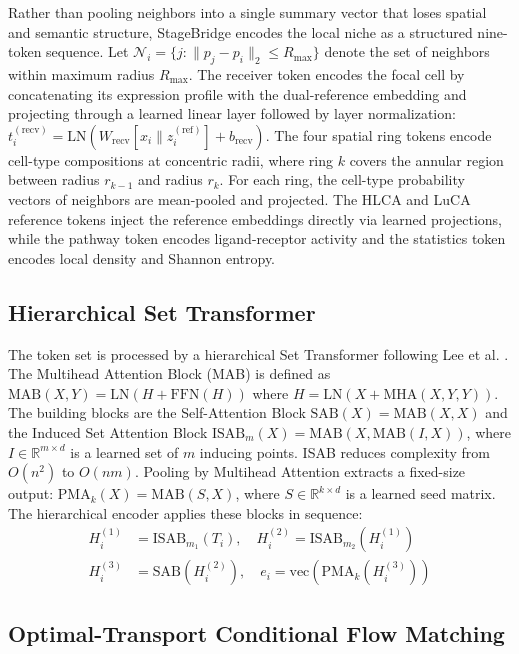 \documentclass[conference]{IEEEtran}
\begin{document}
Rather than pooling neighbors into a single summary vector that loses spatial and semantic structure, StageBridge encodes the local niche as a structured nine-token sequence. Let $\mathcal{N}_i = \{j : \|p_j - p_i\|_2 \leq R_{\max}\}$ denote the set of neighbors within maximum radius $R_{\max}$. The receiver token encodes the focal cell by concatenating its expression profile with the dual-reference embedding and projecting through a learned linear layer followed by layer normalization: $t_i^{(\text{recv})} = \text{LN}(W_{\text{recv}} [x_i \| z_i^{(\text{ref})}] + b_{\text{recv}})$. The four spatial ring tokens encode cell-type compositions at concentric radii, where ring $k$ covers the annular region between radius $r_{k-1}$ and radius $r_k$. For each ring, the cell-type probability vectors of neighbors are mean-pooled and projected. The HLCA and LuCA reference tokens inject the reference embeddings directly via learned projections, while the pathway token encodes ligand-receptor activity and the statistics token encodes local density and Shannon entropy.

\subsection{Hierarchical Set Transformer}

The token set is processed by a hierarchical Set Transformer following Lee et al. \cite{Lee2018-ya}. The Multihead Attention Block (MAB) is defined as $\text{MAB}(X, Y) = \text{LN}(H + \text{FFN}(H))$ where $H = \text{LN}(X + \text{MHA}(X, Y, Y))$. The building blocks are the Self-Attention Block $\text{SAB}(X) = \text{MAB}(X, X)$ and the Induced Set Attention Block $\text{ISAB}_m(X) = \text{MAB}(X, \text{MAB}(I, X))$, where $I \in \mathbb{R}^{m \times d}$ is a learned set of $m$ inducing points. ISAB reduces complexity from $O(n^2)$ to $O(nm)$. Pooling by Multihead Attention extracts a fixed-size output: $\text{PMA}_k(X) = \text{MAB}(S, X)$, where $S \in \mathbb{R}^{k \times d}$ is a learned seed matrix. The hierarchical encoder applies these blocks in sequence:
\begin{align}
H_i^{(1)} &= \text{ISAB}_{m_1}(T_i), \quad H_i^{(2)} = \text{ISAB}_{m_2}(H_i^{(1)}) \\
H_i^{(3)} &= \text{SAB}(H_i^{(2)}), \quad e_i = \text{vec}(\text{PMA}_k(H_i^{(3)}))
\end{align}

\subsection{Optimal-Transport Conditional Flow Matching}
\end{document}
